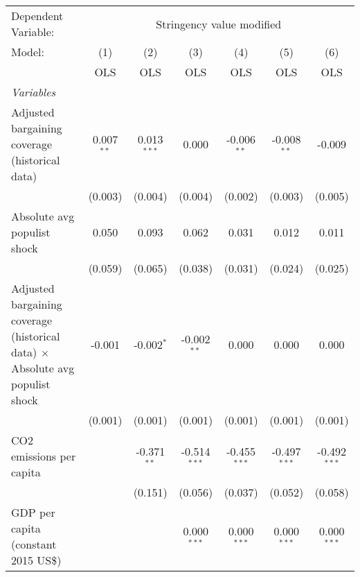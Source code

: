 
\begingroup
\centering
\begin{tabular}{lcccccc}
   \toprule
   Dependent Variable: & \multicolumn{6}{c}{Stringency value modified}\\
   Model:                                                                               & (1)          & (2)           & (3)            & (4)            & (5)            & (6)\\  
                                                                                        &  OLS         & OLS           & OLS            & OLS            & OLS            & OLS\\  
   \midrule
   \emph{Variables}\\
   Adjusted bargaining coverage (historical data)                                       & 0.007$^{**}$ & 0.013$^{***}$ & 0.000          & -0.006$^{**}$  & -0.008$^{**}$  & -0.009\\   
                                                                                        & (0.003)      & (0.004)       & (0.004)        & (0.002)        & (0.003)        & (0.005)\\   
   Absolute avg populist shock                                                          & 0.050        & 0.093         & 0.062          & 0.031          & 0.012          & 0.011\\   
                                                                                        & (0.059)      & (0.065)       & (0.038)        & (0.031)        & (0.024)        & (0.025)\\   
   Adjusted bargaining coverage (historical data) $\times$ Absolute avg populist shock  & -0.001       & -0.002$^{*}$  & -0.002$^{**}$  & 0.000          & 0.000          & 0.000\\   
                                                                                        & (0.001)      & (0.001)       & (0.001)        & (0.001)        & (0.001)        & (0.001)\\   
   CO2 emissions per capita                                                             &              & -0.371$^{**}$ & -0.514$^{***}$ & -0.455$^{***}$ & -0.497$^{***}$ & -0.492$^{***}$\\   
                                                                                        &              & (0.151)       & (0.056)        & (0.037)        & (0.052)        & (0.058)\\   
   GDP per capita (constant 2015 US\$)                                                  &              &               & 0.000$^{***}$  & 0.000$^{***}$  & 0.000$^{***}$  & 0.000$^{***}$\\   

\end{tabular}
